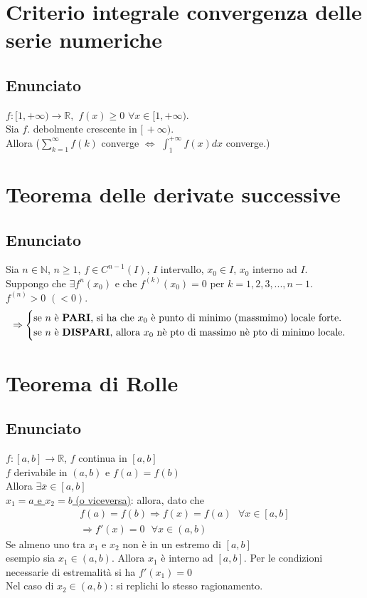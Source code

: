 \documentclass{article}
\newcommand{\R}{\mathbb{R}}
\newcommand{\N}{\mathbb{N}}
\begin{document}
\begin{flushleft}
\section{Criterio integrale convergenza delle serie numeriche}
\subsection{Enunciato}
$f: [1, + \infty ) \rightarrow \R,$ $f(x) \geq 0$ $\forall x \in [1, + \infty)$.
\\Sia $f$. debolmente crescente in $[\, + \infty )$.
\\Allora ($\sum\limits_{k=1}^{\infty} f(k)$ converge $\iff$ $\int_{1}^{+ \infty} f(x) dx$ converge.)

\section{Teorema delle derivate successive}
\subsection{Enunciato}
Sia $n \in \N$, $n \geq 1$, $f \in C^{n-1}(I)$, $I$ intervallo, $x_0 \in I$, $x_0$ interno ad $I$.\\
Suppongo che $\exists f^n(x_0)$ e che $f^{(k)}(x_0)=0$ per $k = 1, 2, 3, ..., n-1$.\\
\hspace*{12.7em}$f^{(n)} > 0$ $(<0)$.\\
\[
    \Rightarrow
    \begin{cases}
        $se $n$ è \textbf{PARI}, si ha che $x_0$ è punto di minimo (massmimo) locale forte.$\\
        $se $n$ è \textbf{DISPARI}, allora $x_0$ nè pto di massimo nè pto di minimo locale.$
    \end{cases}
\]


\section{Teorema di Rolle} \label{Rolle}
\subsection{Enunciato}
$f:[a,b] \rightarrow \R$, $f$ continua in $[a,b]$
\\$f$ derivabile in $(a,b)$ e $f(a) = f(b)$
\\Allora $\exists \overline{x} \in [a,b]$
\\\underline{$x_1 = a$ e $x_2 = b$ (o viceversa)}: allora, dato che
\[
    \begin{array}{c}
        f(a) = f(b) \Rightarrow f(x) = f(a) \text{ } \forall x \in [a,b] \\
        \Rightarrow f'(x) = 0 \text{ } \forall x \in (a,b)
    \end{array}
\]
Se almeno uno tra $x_1$ e $x_2$ non è in un estremo di $[a,b]$
\\esempio sia $x_1 \in (a,b)$. Allora $x_1$ è interno ad $[a,b]$. Per le condizioni necessarie di estremalità si ha $f'(x_1) = 0$
\\Nel caso di $x_2 \in (a,b)$: si replichi lo stesso ragionamento.


\end{flushleft}
\end{document}
